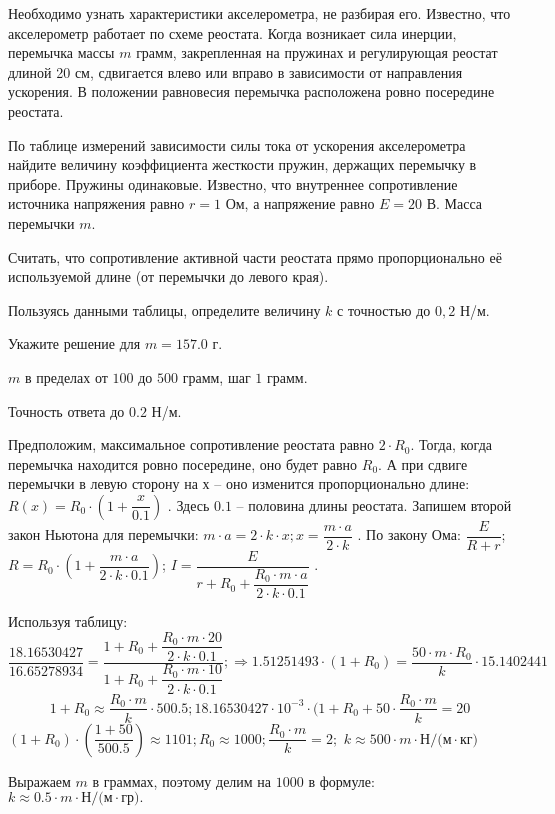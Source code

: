 Необходимо узнать характеристики
акселерометра, не разбирая его. Известно, что акселерометр работает по схеме реостата. Когда возникает сила инерции,
перемычка массы $m$ грамм, закрепленная на пружинах и регулирующая реостат длиной
20 см, сдвигается влево или
вправо в зависимости от направления ускорения. В положении равновесия перемычка
расположена ровно посередине реостата.


По таблице измерений зависимости силы тока от
ускорения акселерометра найдите величину коэффициента жесткости пружин, держащих перемычку в приборе. Пружины
одинаковые. Известно, что
внутреннее сопротивление источника напряжения равно $r = 1$ Ом, а напряжение равно $E = 20$ В.  Масса
перемычки $m$.


Считать, что сопротивление активной части реостата прямо
пропорционально её используемой длине (от перемычки до левого края).

Пользуясь данными таблицы, определите величину $k$ с точностью до $0,2$ Н/м.

Укажите решение для $m=157.0$ г.

\paramSection

$m$ в пределах от $100$ до $500$ грамм, шаг $1$ грамм.  

Точность ответа  до  $0.2$  Н/м.

\soultionSection

Предположим, максимальное сопротивление реостата равно $2 \cdot R_0$. Тогда, когда перемычка находится 
ровно посередине, оно будет равно $R_0$. А при сдвиге перемычки в левую сторону на $х$ – оно изменится 
пропорционально длине: \linebreak $R(x)=R_0 \cdot (1+\dfrac{x}{0.1})$ . Здесь $0.1$ – половина длины реостата. 
Запишем второй закон Ньютона для перемычки:
$m \cdot a=2 \cdot k \cdot x;  x=\dfrac{m \cdot a}{2 \cdot k}$   . По закону Ома:   
$\dfrac{E}{R+r}$; $R=R_0 \cdot \left(1+\dfrac{m \cdot a}{2 \cdot k \cdot 0.1}\right)$; 
$I=  \dfrac{E}{r+R_0+\dfrac{R_0 \cdot m \cdot a}{2 \cdot k \cdot 0.1}}$ . 

Используя таблицу:
$$\dfrac{18.16530427}{16.65278934}=\dfrac{1+R_0+\dfrac{R_0 \cdot m \cdot 20}{2 \cdot k \cdot 0.1}}{1+R_0+\dfrac{R_0 \cdot m \cdot 10}{2 \cdot k \cdot 0.1}}; \Rightarrow  1.51251493 \cdot (1+R_0 )=\dfrac{50 \cdot m \cdot R_0}{k} \cdot 15.1402441$$
$$1+R_0 \approx   \dfrac{R_0 \cdot m}{k}   \cdot 500.5;  18.16530427 \cdot 10^{-3} \cdot (1+R_0+50 \cdot \dfrac{R_0 \cdot m}{k}=20$$
$(1+R_0 ) \cdot \left(\dfrac{1+50}{500.5}\right) \approx 1101;  R_0 \approx 1000;   \dfrac{R_0 \cdot m}{k}=2;$ 
$k \approx 500 \cdot m \cdot \text{Н/(м} \cdot \text{кг}) $  

Выражаем $m$ в граммах, поэтому делим на $1000$ в формуле:  $k \approx 0.5 \cdot m \cdot \text{Н/(м} \cdot \text{гр)}   .$

